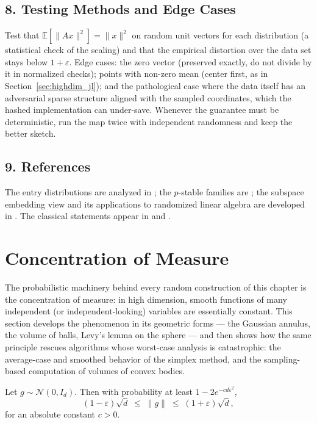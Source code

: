 \subsection{8. Testing Methods and Edge Cases}

Test that $\mathbb{E}[\|A x\|^2] = \|x\|^2$ on random unit vectors for each
distribution (a statistical check of the scaling) and that the empirical
distortion over the data set stays below $1 + \varepsilon$. Edge cases: the
zero vector (preserved exactly, do not divide by it in normalized checks);
points with non-zero mean (center first, as in
Section~\ref{sec:highdim_jl}); and the pathological case where the data
itself has an adversarial sparse structure aligned with the sampled
coordinates, which the hashed implementation can under-save. Whenever the
guarantee must be deterministic, run the map twice with independent randomness
and keep the better sketch.

\subsection{9. References}

The entry distributions are analyzed in \cite{achlioptas2003}; the
$p$-stable families are \cite{datar2004}; the subspace embedding view and its
applications to randomized linear algebra are developed in
\cite{harpeled2011}. The classical statements appear in \cite{johnson1984}
and \cite{matousek2002}.

\section{Concentration of Measure}
\label{sec:highdim_concentration}

The probabilistic machinery behind every random construction of this chapter
is the concentration of measure: in high
dimension, smooth functions of many independent (or independent-looking)
variables are essentially constant. This section develops the phenomenon in
its geometric forms --- the Gaussian annulus, the volume of balls, Levy's
lemma on the sphere --- and then shows how the same principle rescues
algorithms whose worst-case analysis is catastrophic: the average-case and
smoothed behavior of the simplex method, and the sampling-based computation of
volumes of convex bodies.

\begin{theorem}
\label{thm:highdim_gaussian_annulus}
Let $g \sim \mathcal{N}(0, I_d)$. Then with probability at least
$1 - 2 e^{-c d \varepsilon^2}$,
\[
(1 - \varepsilon)\sqrt{d} \;\le\; \|g\| \;\le\; (1 + \varepsilon)\sqrt{d},
\]
for an absolute constant $c > 0$.
\end{theorem}

